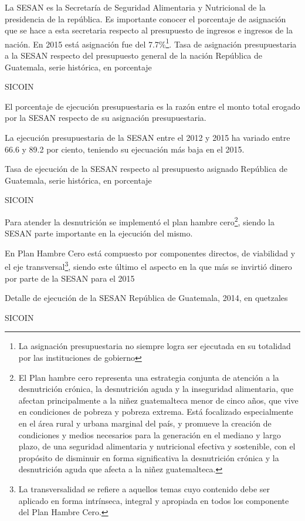 
{%
	La SESAN es la Secretaría de Seguridad Alimentaria y Nutricional de la presidencia de la república. Es importante conocer el porcentaje de asignación que se hace a esta secretaria respecto al presupuesto de ingresos e ingresos de la nación. En 2015 está asignación fue del 7.7\%\footnote{La asignación presupuestaria no siempre logra ser ejecutada en su totalidad por las instituciones de gobierno}.  
 }%
{%
 Tasa de asignación presupuestaria a la SESAN respecto del presupuesto general de la nación } %
{%
 República de Guatemala, serie histórica, en porcentaje} %
{%
 \begin{tikzpicture}[x=1pt,y=1pt]    \end{tikzpicture}}%
{%
 SICOIN} %


 {%
 	El porcentaje de ejecución presupuestaria es la razón entre el monto total erogado por la SESAN respecto de su asignación presupuestaria. 
 	
 	La ejecución presupuestaria de la SESAN entre el 2012 y 2015 ha variado entre 66.6 y 89.2 por ciento, teniendo su ejecuación más baja en el 2015.
 }%
 {%
 	Tasa de ejecución de la SESAN respecto al presupuesto asignado } %
 {%
 	República de Guatemala, serie histórica, en porcentaje} %
 {%
 	\begin{tikzpicture}[x=1pt,y=1pt]    \end{tikzpicture}}%
 {%
 	SICOIN} %
 
 
  {%
  	Para atender la desnutrición se implementó el plan hambre cero\footnote{El Plan hambre cero representa una estrategia conjunta de atención a la desnutrición crónica, la
  		desnutrición aguda y la inseguridad alimentaria, que afectan principalmente a la niñez
  		guatemalteca menor de cinco años, que vive en condiciones de pobreza y pobreza
  		extrema. Está focalizado especialmente en el área rural y urbana marginal del país, y
  		promueve la creación de condiciones y medios necesarios para la generación en el
  		mediano y largo plazo, de una seguridad alimentaria y nutricional efectiva y sostenible,
  		con el propósito de disminuir en forma significativa la desnutrición crónica y la
  		desnutrición aguda que afecta a la niñez guatemalteca.
  		}, siendo la SESAN parte importante en la ejecución del mismo. 
  		
  		En Plan Hambre Cero está compuesto por componentes directos, de viabilidad y el eje transversal\footnote{La transversalidad se refiere a aquellos temas cuyo contenido debe ser aplicado en
  			forma intrínseca, integral y apropiada en todos los componente del Plan Hambre Cero.
  			}, siendo este último el aspecto en la que más se invirtió dinero por parte de la SESAN para el 2015
  	
  	
  }%
  {%
  	Detalle de ejecución de la SESAN } %
  {%
  	República de Guatemala, 2014, en quetzales} %
  {%
  	\begin{tikzpicture}[x=1pt,y=1pt]    \end{tikzpicture}}%
  {%
  	SICOIN} %
  
